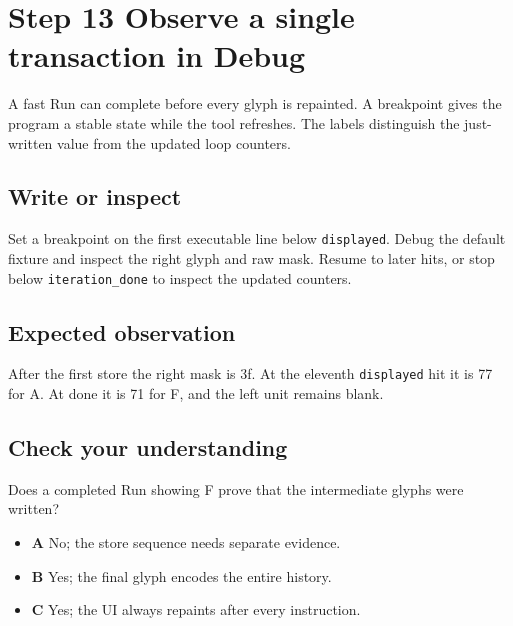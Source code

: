 \section{Step 13 Observe a single transaction in
  Debug}\label{005-seven-segment-counter-s13-step-13-observe-a-single-transaction-in-debug}

A fast Run can complete before every glyph is repainted. A breakpoint
gives the program a stable state while the tool refreshes. The labels
distinguish the just-written value from the updated loop counters.

\subsection{Write or
  inspect}\label{005-seven-segment-counter-s13-write-or-inspect}

Set a breakpoint on the first executable line below \texttt{displayed}.
Debug the default fixture and inspect the right glyph and raw mask.
Resume to later hits, or stop below \texttt{iteration\_done} to inspect
the updated counters.

\subsection{Expected
  observation}\label{005-seven-segment-counter-s13-expected-observation}

After the first store the right mask is 3f. At the eleventh
\texttt{displayed} hit it is 77 for A. At done it is 71 for F, and the
left unit remains blank.

\subsection{Check your
  understanding}\label{005-seven-segment-counter-s13-check-your-understanding}

Does a completed Run showing F prove that the intermediate glyphs were
written?

\begin{itemize}
  \tightlist
  \item
        \textbf{A} No; the store sequence needs separate evidence.
  \item
        \textbf{B} Yes; the final glyph encodes the entire history.
  \item
        \textbf{C} Yes; the UI always repaints after every instruction.
\end{itemize}
